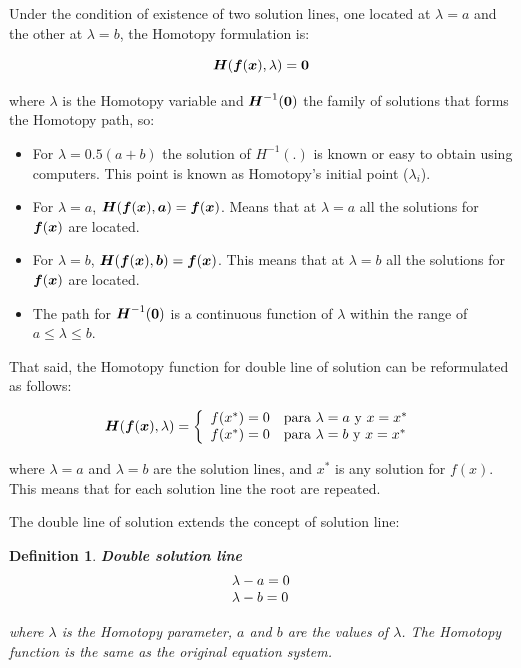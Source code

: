 \documentclass[conference,letterpaper,onecolumn]{IEEEtran}
\newcommand{\pig}[1]{\mbox{\boldmath ${#1}$}	}
\newtheorem{Theod}{{\bf Definition}}
\begin{document}
Under the condition of existence of two solution lines, one located at $\lambda=a$ and the other at $\lambda=b$, the Homotopy formulation is:

\begin{equation}
\pig{H}(\pig{f}(\pig{x}),\lambda ) =\pig{0}
\label{H2M}
\end{equation}

where $\lambda$ is the Homotopy variable and $\pig{H}^{-1}(\pig{0})$ the family of solutions that forms the Homotopy path, so:

\begin{itemize}
\item For $\lambda=0.5(a+b)$ the solution of $H^{-1}(.)$ is known or easy to obtain using computers. This point is known as Homotopy's initial point ($\lambda_i$).
\item For $\lambda=a$, $\pig{H}(\pig{f}(\pig{x}),\pig{a} )=\pig{f}(\pig{x})$. Means that at $\lambda=a$ all the solutions for $\pig{f}(\pig{x})$ are located.
\item For $\lambda=b$, $\pig{H}(\pig{f}(\pig{x}),\pig{b} )=\pig{f}(\pig{x})$. This means that at $\lambda=b$ all the solutions for $\pig{f}(\pig{x})$ are located.
\item The path for $\pig{H}^{-1}(\pig{0})$ is a continuous function of $\lambda$ within the range of $a \leq \lambda \leq b $. 
\end{itemize}

That said, the Homotopy function for double line of solution can be reformulated as follows:

\begin{displaymath}
\pig{H}(\pig{f}(\pig{x}),\lambda ) = \left\{\begin{array}{ll}
f(x^*)=0 & \textrm{para $\lambda=a$ y $x=x^*$}\\
f(x^*)=0 & \textrm{para $\lambda=b$ y $x=x^*$}
\end{array}\right.
\end{displaymath}

where $\lambda=a$ and $\lambda=b$ are the solution lines, and $x^*$ is any solution for $f(x)$. This means that for each solution line the root are repeated.

The double line of solution extends the concept of solution line:

\begin{Theod}
{\bf Double solution line}
\begin{displaymath}
\begin{tabular}{l}
$\lambda-a=0$ \\
$\lambda-b=0$ \\
\end{tabular}
\end{displaymath}

where $\lambda$ is the Homotopy parameter, $a$ and $b$ are the values of $\lambda$. The Homotopy function is the same as the original equation system.

\label{InestCond2}
\end{Theod}
\end{document}
